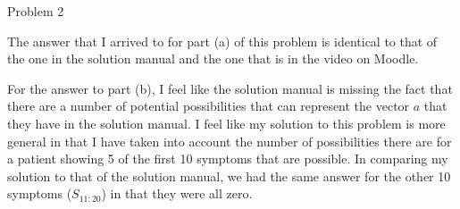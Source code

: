 \begin{problem}{Problem 2}
    \begin{highlight}
        The answer that I arrived to for part (a) of this problem is identical to that of the one in the solution manual and the one that is in the video on Moodle.

        For the answer to part (b), I feel like the solution manual is missing the fact that there are a number of potential possibilities that can represent the vector $a$ that they have
        in the solution manual. I feel like my solution to this problem is more general in that I have taken into account the number of possibilities there are for a patient showing 5 of
        the first 10 symptoms that are possible. In comparing my solution to that of the solution manual, we had the same answer for the other 10 symptoms ($S_{11:20}$) in that they were
        all zero.
    \end{highlight}
\end{problem}

